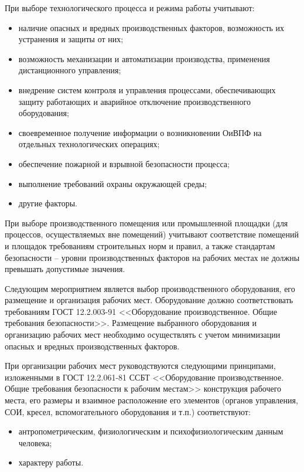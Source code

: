         При выборе технологического процесса и режима работы  учитывают: 
        \begin{itemize}
            \item наличие опасных и вредных производственных факторов,
                возможность их устранения и защиты от них;
            \item возможность механизации и автоматизации производства,
                применения дистанционного управления;
            \item внедрение систем контроля и управления процессами,
                обеспечивающих защиту работающих и аварийное отключение
                производственного оборудования;
            \item своевременное получение информации о возникновении ОиВПФ на
                отдельных технологических операциях;
            \item обеспечение пожарной и взрывной безопасности процесса;
            \item выполнение требований охраны окружающей среды;
            \item другие факторы.
        \end{itemize}

        При выборе производственного помещения или промышленной площадки (для
        процессов, осуществляемых вне помещений) учитывают соответствие
        помещений и площадок требованиям строительных норм и правил, а также
        стандартам безопасности – уровни производственных факторов на рабочих
        местах не должны превышать допустимые значения. 

        Следующим мероприятием является выбор производственного оборудования,
        его размещение и организация рабочих мест. Оборудование должно
        соответствовать требованиям ГОСТ 12.2.003-91 <<Оборудование
        производственное. Общие требования безопасности>>.  Размещение
        выбранного оборудования и организацию рабочих мест необходимо
        осуществлять с учетом минимизации опасных и вредных производственных
        факторов. 

        При организации рабочих мест руководствуются следующими принципами,
        изложенными в ГОСТ 12.2.061-81 ССБТ <<Оборудование производственное.
        Общие требования безопасности к рабочим местам>> конструкция рабочего
        места, его размеры и взаимное расположение его элементов (органов
        управления, СОИ, кресел, вспомогательного оборудования и т.п.)
        соответствуют:
        \begin{itemize}
            \item антропометрическим, физиологическим и психофизиологическим
            данным человека;
            \item характеру работы.
        \end{itemize}

